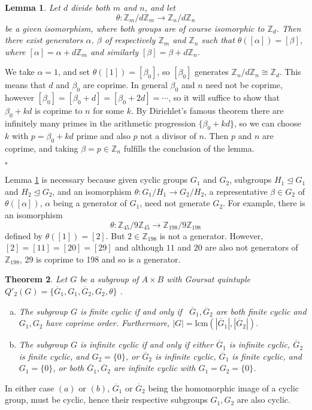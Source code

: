 \documentclass[11pt]{article}
\theoremstyle{change}
\newtheorem{Thm}{Theorem}[section]
\newtheorem{Lem}[Thm]{Lemma}
\newcommand{\<}{\langle}
\renewcommand{\>}{\rangle}
\newcommand{\Proof} {\noindent{\itshape Proof.\quad }}
\newcommand{\qed}{\quad\hfill$\square$}
\begin{document}
 \begin{Lem}\label{l:dirichlet}  Let $d$ divide both $m$ and $n$, and let
 \[ \theta:{\mathbb Z}_m/d{\mathbb Z}_m\to {\mathbb Z}_n/d{\mathbb Z}_n\]
 be a given isomorphism, where both groups are of course isomorphic to ${\mathbb Z}_d$.  Then there exist generators $\alpha$, $\beta$ of respectively ${\mathbb Z}_m$ and ${\mathbb Z}_n$ such that $\theta([\alpha])=[\beta]$, where $[\alpha]=\alpha+d{\mathbb Z}_m$ and similarly $[\beta]=\beta+d{\mathbb Z}_n$.
 \end{Lem}
 
 \Proof We take $\alpha=1$, and set $\theta([1])=[\beta_0]$, so $[\beta_0]$ generates ${\mathbb Z}_n/d{\mathbb Z}_n\cong {\mathbb Z}_d$.  This means that $d$ and $\beta_0$ are coprime.  In general $\beta_0$ and $n$ need not be coprime, however $[\beta_0]=[\beta_0+d]=[\beta_0+2d]= \cdots$, so it will suffice to show that $\beta_0+kd$ is coprime to $n$ for some $k$.  By Dirichlet's famous theorem \cite{Dirichlet} there are infinitely many primes in the arithmetic progression $\{\beta_0+kd\}$, so we can choose $k$ with $p=\beta_0+kd$ prime and also $p$ not a divisor of $n$.  Then $p$ and $n$ are coprime, and taking $\beta=p\in {\mathbb Z}_n$ fulfills the conclusion of the lemma.
 
 \qed
 
Lemma \ref{l:dirichlet}  is necessary because given  cyclic groups $G_1$ and $G_2$, subgroups $H_1 \unlhd G_1$ and $H_2 \unlhd G_2$, and an isomorphism $\theta: G_1/H_1\to G_2/H_2$,  
a representative $\beta \in G_2$ of
$\theta([\alpha])$, $\alpha$ being a generator of $G_1$, need not generate $G_2$.  
For example, there is an isomorphism
 \[ \theta: {\mathbb Z}_{45}/9{\mathbb Z}_{45} \to {\mathbb {Z}}_{198}/9{\mathbb Z}_{198}\]
 defined by $\theta([1])=[2]$.  But $2\in {\mathbb {Z}}_{198}$ is not a generator.  However, $[2]=[11]=[20]=[29]$ and although $11$ and $20$ are also not generators of ${\mathbb Z}_{198}$, 29 is coprime to 198 and so is a generator.
 
 
\begin{Thm}\label{4.2}
 Let $G$ be a subgroup of $A\times B$ with  Goursat quintuple $Q'_2(G)=\{ \overline{G}_1, G_1, \overline{G}_2, G_2, \theta\}$ .
\begin{enumerate}[(a)]
 \item The subgroup $G$ is finite cyclic if and only if \  $\overline{G}_1, \overline{G}_2$ are both finite cyclic and $G_1,G_2$ have coprime order. Furthermore, $|G|=\mbox{lcm}(|\overline{G}_1|,|\overline{G}_2|)$.
\item The subgroup $G$ is infinite cyclic if and only if either $\overline{G}_1$ is infinite cyclic, $\overline{G}_2$ is finite cyclic, and $G_2=\{0\}$, or $\overline{G}_2$ is infinite cyclic, $\overline{G}_1$ is finite cyclic, and $G_1=\{0\}$, or both $\overline{G}_1,\overline{G}_2$ are infinite cyclic with $G_1=G_2=\{0\}$.
 \end{enumerate}
\end{Thm}
\Proof
In either case $(a)$ or $(b)$, $\overline{G}_1$ or $\overline{G}_2$ being the homomorphic image of a cyclic group, must be cyclic, hence their respective subgroups $G_1,G_2$ are also cyclic. 
\end{document}

